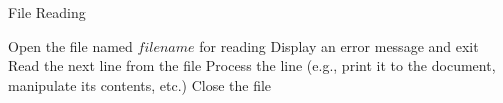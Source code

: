 \documentclass{article}
\begin{document}
\begin{algorithm}
\caption{File Reading}
\begin{algorithmic}[0]
    \State Open the file named $filename$ for reading
        \State Display an error message and exit
    \EndIf
        \State Read the next line from the file
        \State Process the line (e.g., print it to the document, manipulate its contents, etc.)
    \EndWhile
    \State Close the file
\EndProcedure
\end{algorithmic}
\end{algorithm}
\end{document}
